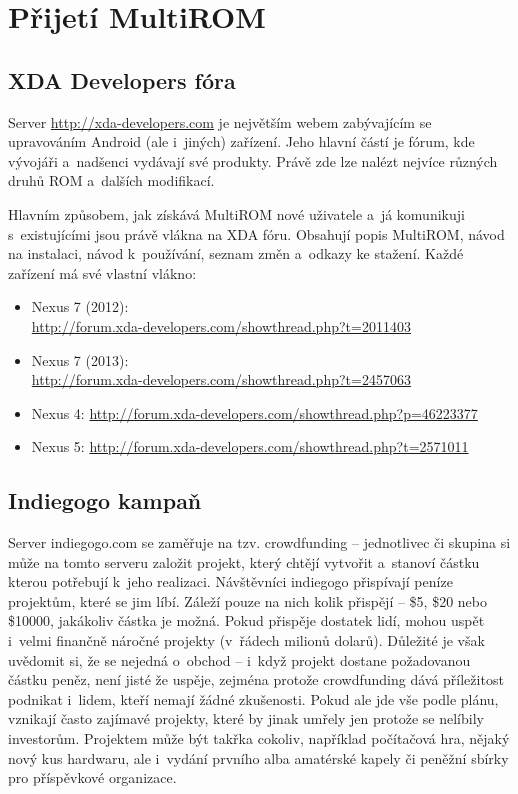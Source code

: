 \documentclass[12pt, a4paper, oneside]{article}
\begin{document}
\section{Přijetí MultiROM}
\subsection{XDA Developers fóra}
Server \url{http://xda-developers.com} je největším webem zabývajícím se upravováním Android (ale i~jiných) zařízení. Jeho hlavní částí je fórum, kde vývojáři a~nadšenci vydávají své produkty. Právě zde lze nalézt nejvíce různých druhů ROM a~dalších modifikací.

Hlavním způsobem, jak získává MultiROM nové uživatele a~já komunikuji s~existujícími jsou právě vlákna na XDA fóru. Obsahují popis MultiROM, návod na instalaci, návod k~používání, seznam změn a~odkazy ke stažení. Každé zařízení má své vlastní vlákno:

\begin{itemize}
\item Nexus 7 (2012):\\ \url{http://forum.xda-developers.com/showthread.php?t=2011403}
\item Nexus 7 (2013):\\ \url{http://forum.xda-developers.com/showthread.php?t=2457063}
\item Nexus 4: \url{http://forum.xda-developers.com/showthread.php?p=46223377}
\item Nexus 5: \url{http://forum.xda-developers.com/showthread.php?t=2571011}
\end{itemize}

\subsection{Indiegogo kampaň}
Server indiegogo.com\cite{indiegogo} se zaměřuje na tzv. crowdfunding -- jednotlivec či skupina si může na tomto serveru založit projekt, který chtějí vytvořit a~stanoví částku kterou potřebují k~jeho realizaci. Návštěvníci indiegogo přispívají peníze projektům, které se jim líbí. Záleží pouze na nich kolik přispějí -- \$5, \$20 nebo \$10000, jakákoliv částka je možná. Pokud přispěje dostatek lidí, mohou uspět i~velmi finančně náročné projekty (v~řádech milionů dolarů). Důležité je však uvědomit si, že se nejedná o~obchod -- i~když projekt dostane požadovanou částku peněz, není jisté že uspěje, zejména protože crowdfunding dává příležitost podnikat i~lidem, kteří nemají žádné zkušenosti. Pokud ale jde vše podle plánu, vznikají často zajímavé projekty, které by jinak umřely jen protože se nelíbily investorům. Projektem může být takřka cokoliv, například počítačová hra, nějaký nový kus hardwaru, ale i~vydání prvního alba amatérské kapely či peněžní sbírky pro příspěvkové organizace.
\end{document}
